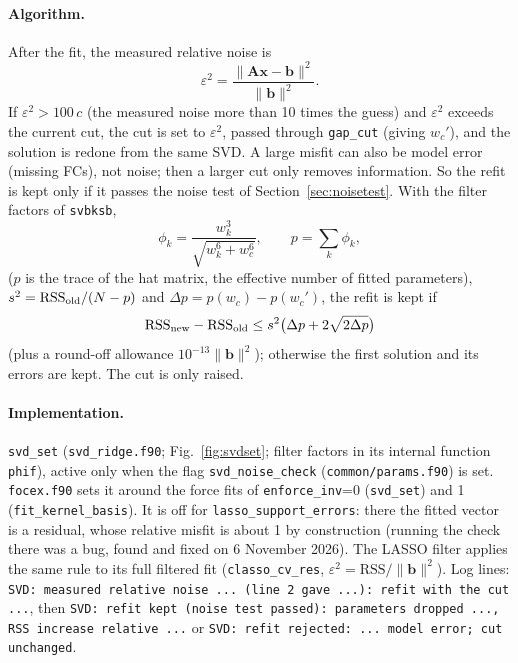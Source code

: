 \documentclass[11pt,a4paper]{article}
\newcommand{\bA}{\mathbf A}
\newcommand{\bx}{\mathbf x}
\newcommand{\bb}{\mathbf b}
\newcommand{\code}[1]{\texttt{#1}}
\begin{document}
\paragraph{Algorithm.} After the fit, the measured relative noise is
\begin{equation}
\varepsilon^2=\frac{\|\bA\bx-\bb\|^2}{\|\bb\|^2}.
\end{equation}
If $\varepsilon^2>100\,c$ (the measured noise more than 10 times the guess) and $\varepsilon^2$ exceeds the
current cut, the cut is set to $\varepsilon^2$, passed through \code{gap\_cut} (giving $w_c'$), and the
solution is redone from the same SVD. A large misfit can also be model error (missing FCs), not noise; then
a larger cut only removes information. So the refit is kept only if it passes the noise test of
Section~\ref{sec:noisetest}. With the filter factors of \code{svbksb},
\begin{equation}
\phi_k=\frac{w_k^3}{\sqrt{w_k^6+w_c^6}},\qquad p=\sum_k\phi_k ,
\end{equation}
($p$ is the trace of the hat matrix, the effective number of fitted parameters), $s^2=\mathrm{RSS}_{\rm old}/(N-p)$
and $\Delta p=p(w_c)-p(w_c')$, the refit is kept if
\begin{equation}
\mathrm{RSS}_{\rm new}-\mathrm{RSS}_{\rm old}\le s^2\big(\Delta p+2\sqrt{2\Delta p}\big)
\end{equation}
(plus a round-off allowance $10^{-13}\|\bb\|^2$); otherwise the first solution and its errors are kept. The cut
is only raised.

\paragraph{Implementation.} \code{svd\_set} (\code{svd\_ridge.f90}; Fig.~\ref{fig:svdset}; filter factors in its internal function
\code{phif}), active only when the flag \code{svd\_noise\_check} (\code{common/params.f90}) is set.
\code{focex.f90} sets it around the force fits of \code{enforce\_inv}=0 (\code{svd\_set}) and 1
(\code{fit\_kernel\_basis}). It is off for \code{lasso\_support\_errors}: there the fitted vector is a
residual, whose relative misfit is about 1 by construction (running the check there was a bug, found and
fixed on 6 November 2026). The LASSO filter applies the same rule to its full filtered fit
(\code{classo\_cv\_res}, $\varepsilon^2=\mathrm{RSS}/\|\bb\|^2$). Log lines: \code{SVD: measured relative noise
... (line 2 gave ...): refit with the cut ...}, then \code{SVD: refit kept (noise test passed): parameters
dropped ..., RSS increase relative ...} or \code{SVD: refit rejected: ... model error; cut unchanged}.
\end{document}
